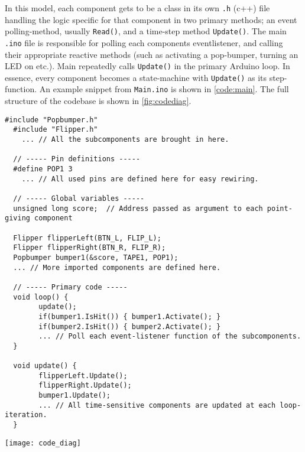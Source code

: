 In this model, each component gets to be a class in its own \verb|.h| (c++) file handling the logic specific for that component in two primary methods; an event polling-method, usually \verb|Read()|, and a time-step method \verb|Update()|. 
The main \verb|.ino| file is responsible for polling each components eventlistener, and calling their appropriate reactive methods (such as activating a pop-bumper, turning an LED on etc.). 
Main repeatedly calls \verb|Update()| in the primary Arduino loop.
In essence, every component becomes a state-machine with \verb|Update()| as its step-function. 
An example snippet from \verb|Main.ino| is shown in \ref{code:main}.
The full structure of the codebase is shown in \ref{fig:codediag}. 

\begin{figure*}
	\begin{lstlisting}[style=c]
  #include "Popbumper.h"
  #include "Flipper.h"
	... // All the subcomponents are brought in here.
	
  // ----- Pin definitions -----
  #define POP1 3      
	... // All used pins are defined here for easy rewiring.
	
  // ----- Global variables -----
  unsigned long score;  // Address passed as argument to each point-giving component
	
  Flipper flipperLeft(BTN_L, FLIP_L);
  Flipper flipperRight(BTN_R, FLIP_R);
  Popbumper bumper1(&score, TAPE1, POP1);
  ... // More imported components are defined here.
	
  // ----- Primary code -----
  void loop() {
		update();
		if(bumper1.IsHit()) { bumper1.Activate(); }
		if(bumper2.IsHit()) { bumper2.Activate(); }
		... // Poll each event-listener function of the subcomponents.
  }
	
  void update() {
 		flipperLeft.Update();
		flipperRight.Update();
		bumper1.Update();
		... // All time-sensitive components are updated at each loop-iteration.
  }
	\end{lstlisting}
	\caption{A snippet of the structure of the main Arduino sketch.}
	\label{code:main}
\end{figure*}


\begin{figure*}[h]
	\centering
	\texttt{[image: code\_diag]}
	\caption{Overview of the code hierarchical structure.}
	\label{fig:codediag}
\end{figure*}